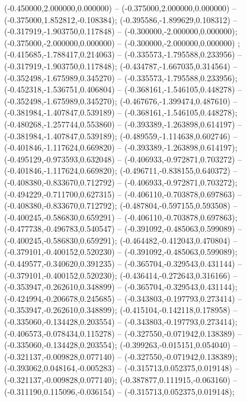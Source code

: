  (-0.450000,2.000000,0.000000) -- (-0.375000,2.000000,0.000000) -- (-0.375000,1.852812,-0.108384);
 (-0.395586,-1.899629,0.108312) -- (-0.317919,-1.903750,0.117848) -- (-0.300000,-2.000000,0.000000);
 (-0.375000,-2.000000,0.000000) -- (-0.300000,-2.000000,0.000000) ;
 (-0.415685,-1.788417,0.214063) -- (-0.335573,-1.795588,0.233956) -- (-0.317919,-1.903750,0.117848);
 (-0.434787,-1.667035,0.314564) -- (-0.352498,-1.675989,0.345270) -- (-0.335573,-1.795588,0.233956);
 (-0.452318,-1.536751,0.406804) -- (-0.368161,-1.546105,0.448278) -- (-0.352498,-1.675989,0.345270);
 (-0.467676,-1.399474,0.487610) -- (-0.381984,-1.407847,0.539189) -- (-0.368161,-1.546105,0.448278);
 (-0.480268,-1.257744,0.553860) -- (-0.393389,-1.263898,0.614197) -- (-0.381984,-1.407847,0.539189);
 (-0.489559,-1.114638,0.602746) -- (-0.401846,-1.117624,0.669820) -- (-0.393389,-1.263898,0.614197);
 (-0.495129,-0.973593,0.632048) -- (-0.406933,-0.972871,0.703272) -- (-0.401846,-1.117624,0.669820);
 (-0.496711,-0.838155,0.640372) -- (-0.408380,-0.833670,0.712792) -- (-0.406933,-0.972871,0.703272);
 (-0.494229,-0.711700,0.627315) -- (-0.406110,-0.703878,0.697863) -- (-0.408380,-0.833670,0.712792);
 (-0.487804,-0.597155,0.593508) -- (-0.400245,-0.586830,0.659291) -- (-0.406110,-0.703878,0.697863);
 (-0.477738,-0.496783,0.540547) -- (-0.391092,-0.485063,0.599089) -- (-0.400245,-0.586830,0.659291);
 (-0.464482,-0.412043,0.470804) -- (-0.379101,-0.400152,0.520230) -- (-0.391092,-0.485063,0.599089);
 (-0.449577,-0.340620,0.391235) -- (-0.365704,-0.329543,0.431144) -- (-0.379101,-0.400152,0.520230);
 (-0.436414,-0.272643,0.316166) -- (-0.353947,-0.262610,0.348899) -- (-0.365704,-0.329543,0.431144);
 (-0.424994,-0.206678,0.245685) -- (-0.343803,-0.197793,0.273414) -- (-0.353947,-0.262610,0.348899);
 (-0.415104,-0.142118,0.178958) -- (-0.335060,-0.134428,0.203554) -- (-0.343803,-0.197793,0.273414);
 (-0.406573,-0.078434,0.115278) -- (-0.327550,-0.071942,0.138389) -- (-0.335060,-0.134428,0.203554);
 (-0.399263,-0.015151,0.054040) -- (-0.321137,-0.009828,0.077140) -- (-0.327550,-0.071942,0.138389);
 (-0.393062,0.048164,-0.005283) -- (-0.315713,0.052375,0.019148) -- (-0.321137,-0.009828,0.077140);
 (-0.387877,0.111915,-0.063160) -- (-0.311190,0.115096,-0.036154) -- (-0.315713,0.052375,0.019148);

